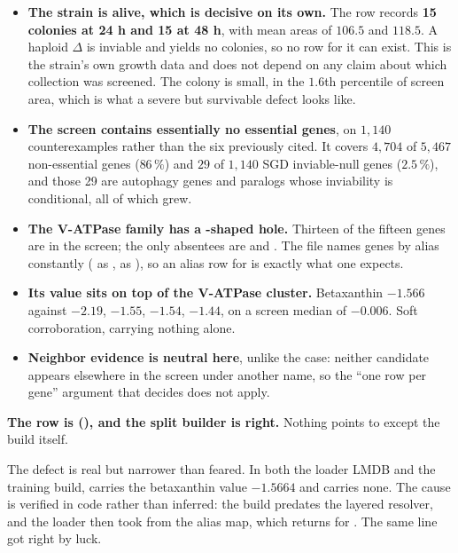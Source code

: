 \begin{itemize}
\item \textbf{The strain is alive, which is decisive on its own.} The  row records
  \textbf{15 colonies at 24 h and 15 at 48 h}, with mean areas of $106.5$ and $118.5$. A
  haploid $\Delta$ is inviable and yields no colonies, so no row for it can exist.
  This is the strain's own growth data and does not depend on any claim about which
  collection was screened. The colony is small, in the $1.6$th percentile of screen area,
  which is what a severe but survivable defect looks like.
\item \textbf{The screen contains essentially no essential genes}, on $1{,}140$
  counterexamples rather than the six previously cited. It covers $4{,}704$ of $5{,}467$
  non-essential genes ($86\,\%$) and $29$ of $1{,}140$ SGD inviable-null genes ($2.5\,\%$),
  and those 29 are autophagy genes and paralogs whose inviability is conditional, all of
  which grew.
\item \textbf{The V-ATPase family has a -shaped hole.} Thirteen of the fifteen
   genes are in the screen; the only absentees are  and .
  The file names genes by alias constantly ( as ,  as
  ), so an alias row for  is exactly what one expects.
\item \textbf{Its value sits on top of the V-ATPase cluster.} Betaxanthin $-1.566$ against
   $-2.19$,  $-1.55$,  $-1.54$,  $-1.44$, on a
  screen median of $-0.006$. Soft corroboration, carrying nothing alone.
\item \textbf{Neighbor evidence is neutral here}, unlike the  case: neither
  candidate appears elsewhere in the screen under another name, so the ``one row per gene''
  argument that decides  does not apply.
\end{itemize}

\textbf{The  row is  (), and the split builder is
right.} Nothing points to  except the build itself.

 The defect is real
but narrower than feared. In both the loader LMDB and the 
training build,  carries the betaxanthin value $-1.5664$ and 
carries none. The cause is verified in code rather than inferred: the build predates the
layered resolver, and the loader then took  from the alias map, which
returns  for . The same line got  right by luck.

